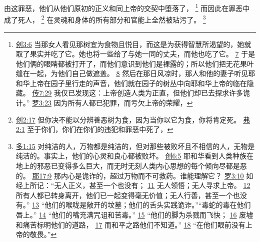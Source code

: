 \documentclass[12pt, a4paper, oneside]{ctexart}
\newcounter{parnum}[section]
\newcommand{\N}{%
   \noindent\refstepcounter{parnum}%
    \makebox[\parindent][l]{\textbf{\arabic{parnum}.}}}
\begin{document}
\N 由这罪恶，他们从他们原初的正义和同上帝的交契中堕落了，
	\footnote {
		\href{https://biblehub.com/genesis/3-6.htm}{创3:6} 当那女人看见那树宜为食物且悦目，而这是为获得智慧所渴望的，她就取了果实并吃了它。她也将一些给了与她一同的丈夫，而他也吃了它。
		\href{https://biblehub.com/genesis/3-7.htm}{7} 于是他们俩的眼睛都被打开了，而他们意识到他们是裸露的；所以他们把无花果叶缝在一起，为他们自己做遮盖。
		\href{https://biblehub.com/genesis/3-8.htm}{8} 然后在那日风凉时，那人和他的妻子听见耶和华上帝在园子里行走的声音，他们就在园子的树丛中向耶和华上帝的临在隐藏。
		\href{https://biblehub.com/ecclesiastes/7-29.htm}{传7:29} 我仅已发现这：上帝创造人类为正直，但他们却已去探求许多诡计。”
		\href{https://biblehub.com/romans/3-23.htm}{罗3:23} 因为所有人都已犯罪，而亏欠上帝的荣耀，
	}
	而因此在罪恶中成了死人，
	\footnote {
		\href{https://biblehub.com/genesis/2-17.htm}{创2:17} 但你决不能以分辨善恶树为食，因为当你以它为食，你将肯定死。
		\href{https://biblehub.com/ephesians/2-1.htm}{弗2:1} 至于你们，你们在你们的违犯和罪恶中死了，
	}
	在灵魂和身体的所有部分和官能上全然被玷污了。
	\footnote {
		\href{https://biblehub.com/titus/1-15.htm}{多1:15} 对纯洁的人，万物都是纯洁的，但对那些被败坏且不相信的人，无物是纯洁的。事实上，他们的心灵和良心都被败坏。
		\href{https://biblehub.com/genesis/6-5.htm}{创6:5} 耶和华看到人类种族在地上的邪恶已变得多么巨大，而无时无刻人类内心思想的每个倾向尽都是恶的。
		\href{https://biblehub.com/jeremiah/17-9.htm}{耶17:9} 那内心是诡诈的，超过万物而不可救药。谁能理解它？
		\href{https://biblehub.com/romans/3-10.htm}{罗3:10} 如经上所记：“无人正义，甚至一个也没有；
		\href{https://biblehub.com/romans/3-11.htm}{11} 无人领悟；无人寻求上帝。
		\href{https://biblehub.com/romans/3-12.htm}{12} 所有人都已转身离开，他们已一起变得毫无价值；无人行善，甚至一个也没有。”
		\href{https://biblehub.com/romans/3-13.htm}{13} “他们的喉咙是敞开的坟墓；他们的舌头实践诡诈。”“毒蛇的毒在他们唇上。”
		\href{https://biblehub.com/romans/3-14.htm}{14} “他们的嘴充满咒诅和苦毒。”
		\href{https://biblehub.com/romans/3-15.htm}{15} “他们的脚为杀戮而飞快；
		\href{https://biblehub.com/romans/3-16.htm}{16} 废墟和痛苦标明他们的道路，
		\href{https://biblehub.com/romans/3-17.htm}{17} 而和平之路他们不知道。”
		\href{https://biblehub.com/romans/3-18.htm}{18} “在他们眼前没有上帝的敬畏。”
	}
\end{document}

